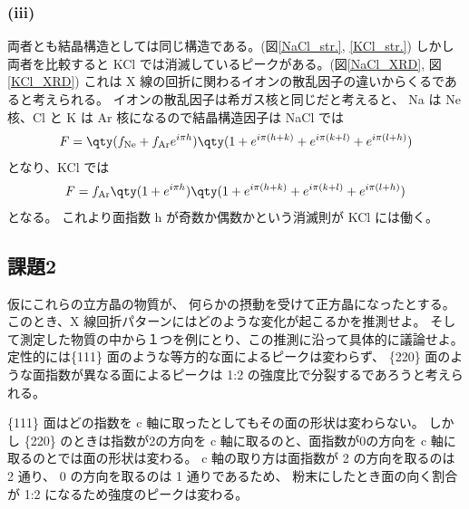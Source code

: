 \documentclass[11pt,dvipdfmx,a4paper]{jsarticle}
\begin{document}
\subsubsection*{(iii)}
両者とも結晶構造としては同じ構造である。(図\ref{NaCl_str.}, \ref{KCl_str.})
しかし両者を比較すると KCl では消滅しているピークがある。(図\ref{NaCl_XRD}, 図\ref{KCl_XRD})
これは X 線の回折に関わるイオンの散乱因子の違いからくるであると考えられる。
イオンの散乱因子は希ガス核と同じだと考えると、
Na は Ne 核、Cl と K は Ar 核になるので結晶構造因子は
NaCl では
\begin{align}
	F = \qty(f_{\text{Ne}}+f_{\text{Ar}}e^{i\pi h})\qty(1+e^{i\pi(h+k)}+e^{i\pi(k+l)}+e^{i\pi(l+h)})
\end{align}
となり、KCl では
\begin{align}
	F = f_{\text{Ar}}\qty(1 + e^{i\pi h})\qty(1+e^{i\pi(h+k)}+e^{i\pi(k+l)}+e^{i\pi(l+h)})
\end{align}
となる。
これより面指数 h が奇数か偶数かという消滅則が KCl には働く。

\subsection*{課題2} 仮にこれらの立方晶の物質が、
何らかの摂動を受けて正方晶になったとする。
このとき、X 線回折パターンにはどのような変化が起こるかを推測せよ。
そして測定した物質の中から１つを例にとり、この推測に沿って具体的に議論せよ。\\

定性的には\{111\} 面のような等方的な面によるピークは変わらず、
\{220\} 面のような面指数が異なる面によるピークは 1:2 の強度比で分裂するであろうと考えられる。

\{111\} 面はどの指数を c 軸に取ったとしてもその面の形状は変わらない。%
しかし \{220\} のときは指数が2の方向を c 軸に取るのと、面指数が0の方向を c 軸に取るのとでは面の形状は変わる。
c 軸の取り方は面指数が 2 の方向を取るのは 2 通り、 0 の方向を取るのは 1 通りであるため、
粉末にしたとき面の向く割合が 1:2 になるため強度のピークは変わる。
\end{document}
